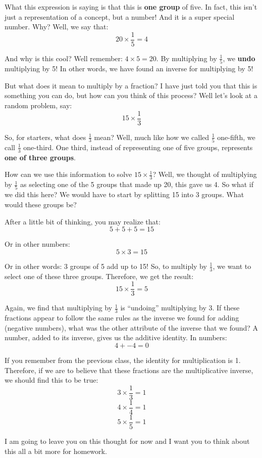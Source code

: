 \documentclass{article}
\begin{document}
What this expression is saying is that this is \textbf{one group} of five. In fact, this isn't just a representation of a concept, but a number! And it is a super special number. Why? Well, we say that:
\[ 20 \times \frac{1}{5} = 4 \]

And why is this cool? Well remember: $4 \times 5 = 20$. By multiplying by $\frac{1}{5}$, we \textbf{undo} multiplying by 5! In other words, we have found an inverse for multiplying by 5!

But what does it mean to multiply by a fraction? I have just told you that this is something you can do, but how can you think of this process? Well let's look at a random problem, say:
\[ 15 \times \frac{1}{3} \]

So, for starters, what does $\frac{1}{3}$ mean? Well, much like how we called $\frac{1}{5}$ one-fifth, we call $\frac{1}{3}$ one-third. One third, instead of representing one of five groups, represents \textbf{one of three groups}. 

How can we use this information to solve $15 \times \frac{1}{3}$? Well, we thought of multiplying by $\frac{1}{5}$ as selecting one of the 5 groups that made up 20, this gave us 4. So what if we did this here? We would have to start by splitting 15 into 3 groups. What would these groups be? 

After a little bit of thinking, you may realize that: 
\[ 5 + 5 + 5 = 15 \]

Or in other numbers:
\[ 5 \times 3 = 15 \]

Or in other words: 3 groups of 5 add up to 15! So, to multiply by $\frac{1}{3}$, we want to select one of these three groups. Therefore, we get the result:
\[ 15 \times \frac{1}{3} = 5 \]

Again, we find that multiplying by $\frac{1}{3}$ is ``undoing'' multiplying by 3. If these fractions appear to follow the same rules as the inverse we found for adding (negative numbers), what was the other attribute of the inverse that we found? A number, added to its inverse, gives us the additive identity. In numbers:
\[ 4 + -4 = 0 \]

If you remember from the previous class, the identity for multiplication is 1. Therefore, if we are to believe that these fractions are the multiplicative inverse, we should find this to be true:
\[ 3 \times \frac{1}{3} = 1 \]
\[ 4 \times \frac{1}{4} = 1 \]
\[ 5 \times \frac{1}{5} = 1 \]

I am going to leave you on this thought for now and I want you to think about this all a bit more for homework. 
\end{document}
